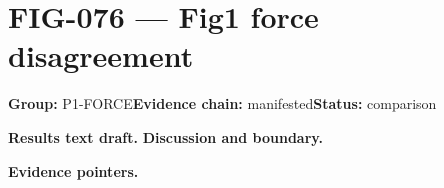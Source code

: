 \clearpage
\section{FIG-076 --- Fig1 force disagreement}
\label{figpage:fig-076}
\textbf{Group:} P1-FORCE\quad \textbf{Evidence chain:} manifested\quad \textbf{Status:} comparison

\textbf{Results text draft.} 
\textbf{Discussion and boundary.} 


\textbf{Evidence pointers.}



\vfill
